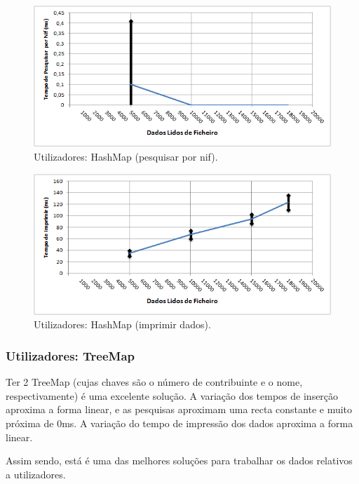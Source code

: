 \documentclass[a5paper,twocolumn, 11pt]{article}
\begin{document}
\begin{figure}[h!b!t!]
    \caption[Utilizadores: HashMap (pesquisar por nif)]{Utilizadores: HashMap (pesquisar por nif).}
    \label{hashtable}
    \centering
        \includegraphics[width=400pt]{user_c3_o4.png}
\end{figure}
\begin{figure}[h!b!t!]
    \caption[Utilizadores: HashMap (imprimir dados)]{Utilizadores: HashMap (imprimir dados).}
    \label{hashtable}
    \centering
        \includegraphics[width=400pt]{user_c3_o5.png}
\end{figure}

\newpage
\twocolumn
\subsubsection{Utilizadores: TreeMap}
Ter 2 TreeMap (cujas chaves são o número de contribuinte e o nome, respectivamente) é uma excelente solução.
A variação dos tempos de inserção aproxima a forma linear, e as pesquisas aproximam uma recta constante e muito próxima de 0ms.
A variação do tempo de impressão dos dados aproxima a forma linear.

Assim sendo, está é uma das melhores soluções para trabalhar os dados relativos a utilizadores.
\end{document}
